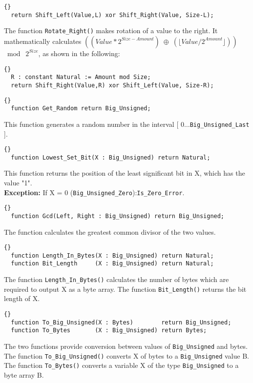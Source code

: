 \begin{lstlisting}{}
  return Shift_Left(Value,L) xor Shift_Right(Value, Size-L);
\end{lstlisting}
The function \texttt{Rotate\_Right()} makes rotation of a value to the
right. It mathematically calculates $((Value * 2^{Size - Amount})\;
\oplus\; (\lfloor Value / 2^{Amount}\rfloor))$ $\bmod\; 2^{Size}$, as
shown in the following:
\begin{lstlisting}{}
  R : constant Natural := Amount mod Size;
  return Shift_Right(Value,R) xor Shift_Left(Value, Size-R);
\end{lstlisting}

\hhline
\begin{lstlisting}{}
  function Get_Random return Big_Unsigned;
\end{lstlisting}
This function generates a random number in the interval [
  $0\ldots$\texttt{Big\_Unsigned\_Last} ].

\hhline
\begin{lstlisting}{}
  function Lowest_Set_Bit(X : Big_Unsigned) return Natural;
\end{lstlisting}
This function returns the position of the least significant bit in X,
which has the value "1".\\

\noindent\textbf{Exception:} If X = 0
(\texttt{Big\_Unsigned\_Zero}):\quad \texttt{Is\_Zero\_Error}.

\hhline
\begin{lstlisting}{}
  function Gcd(Left, Right : Big_Unsigned) return Big_Unsigned;
\end{lstlisting}
The function calculates the greatest common divisor of the two values.\\

\hhline
\begin{lstlisting}{}
  function Length_In_Bytes(X : Big_Unsigned) return Natural;
  function Bit_Length     (X : Big_Unsigned) return Natural;
\end{lstlisting}
The function \texttt{Length\_In\_Bytes()} calculates the number of
bytes which are required to output X as a byte array. The function
\texttt{Bit\_Length()} returns the bit length of X.

\hhline
\begin{lstlisting}{}
  function To_Big_Unsigned(X : Bytes)        return Big_Unsigned;
  function To_Bytes       (X : Big_Unsigned) return Bytes;
\end{lstlisting}
The two functions provide conversion between values of
\texttt{Big\_Unsigned} and bytes.  The function
\texttt{To\_Big\_Unsigned()} converts X of bytes to a
\texttt{Big\_Unsigned} value B. The function \texttt{To\_Bytes()}
converts a variable X of the type \texttt{Big\_Unsigned} to a byte
array B.\\

